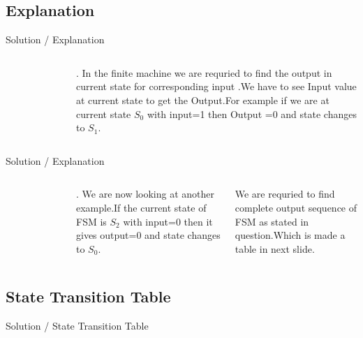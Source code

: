 \documentclass{beamer}
\begin{document}
\subsection{Explanation}
\begin{frame}{Solution / Explanation}
\begin{columns}
\vspace{-0.05cm} %
\begin{figure}[h]
    \scalebox{0.6}{
     }
    \label{fig:ques_}
\end{figure}.
In the finite machine we are requried to find the output in current state for corresponding input .We have to see Input value at current state to get the Output.For example if we are at current state $S_0$ with input=1 then Output =0 and state changes to $S_1$.
\end{columns}
\end{frame}


\begin{frame}{Solution / Explanation}
\begin{columns}
\vspace{-0.05cm} %
\begin{figure}[h]
    \scalebox{0.6}{
     }
    \label{fig:ques_}
\end{figure}.
We are now looking at another example.If the current state of FSM is $S_2$ with input=0
then it gives output=0 and state changes to $S_0$.

We are requried to find complete output sequence of FSM as stated in question.Which is made a table in next slide.  




\end{columns}
\end{frame}

\subsection{State Transition Table}
\begin{frame}{Solution / State Transition Table}
    \begin{table}[h]
    \centering
    \scalebox{0.8}{
    }
    \caption{Table for States,Input and Output of finite state machine}
    \label{table}
\end{table}
\end{frame}
\end{document}
